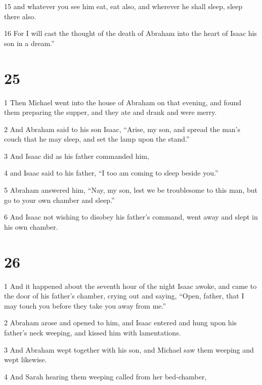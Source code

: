 \par 15 and whatever you see him eat, eat also, and wherever he shall sleep, sleep there also. 

\par 16 For I will cast the thought of the death of Abraham into the heart of Isaac his son in a dream.”

\chapter{25}

\par 1 Then Michael went into the house of Abraham on that evening, and found them preparing the supper, and they ate and drank and were merry. 

\par 2 And Abraham said to his son Isaac, “Arise, my son, and spread the man's couch that he may sleep, and set the lamp upon the stand.” 

\par 3 And Isaac did as his father commanded him, 

\par 4 and Isaac said to his father, “I too am coming to sleep beside you.” 

\par 5 Abraham answered him, “Nay, my son, lest we be troublesome to this man, but go to your own chamber and sleep.” 

\par 6 And Isaac not wishing to disobey his father's command, went away and slept in his own chamber.

\chapter{26}

\par 1 And it happened about the seventh hour of the night Isaac awoke, and came to the door of his father's chamber, crying out and saying, “Open, father, that I may touch you before they take you away from me.” 

\par 2 Abraham arose and opened to him, and Isaac entered and hung upon his father's neck weeping, and kissed him with lamentations. 

\par 3 And Abraham wept together with his son, and Michael saw them weeping and wept likewise. 

\par 4 And Sarah hearing them weeping called from her bed-chamber, 

